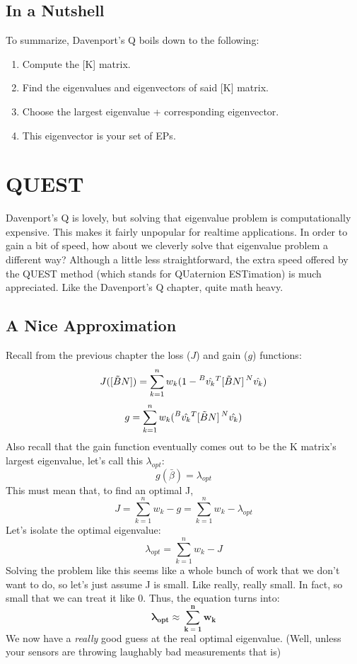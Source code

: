 \documentclass[a4paper,14pt]{extreport}
\newcommand{\vk}[1]{\prescript{#1}{}{\hat{v_k}}}
\begin{document}
\section{In a Nutshell}

To summarize, Davenport's Q boils down to the following:
\begin{enumerate}
\item{Compute the [K] matrix.}
\item{Find the eigenvalues and eigenvectors of said [K] matrix.}
\item{Choose the largest eigenvalue + corresponding eigenvector.}
\item{This eigenvector is your set of EPs.}
\end{enumerate}


\chapter{QUEST}
Davenport's Q is lovely, but solving that eigenvalue problem is computationally expensive. This makes it fairly unpopular for realtime applications. In order to gain a bit of speed, how about we cleverly solve that eigenvalue problem a different way? Although a little less straightforward, the extra speed offered by the QUEST method (which stands for QUaternion ESTimation) is much appreciated. Like the Davenport's Q chapter, quite math heavy.
\section{A Nice Approximation}
Recall from the previous chapter the loss ($J$) and gain ($g$) functions:
\[
J([\tilde{B}N]) = \sum^n_{k=1} w_k (1- \vk{B}^T[\tilde{B}N]\vk{N})
\]
\[
g = \sum^n_{k=1} w_k (\vk{B}^T[\tilde{B}N]\vk{N})
\]
Also recall that the gain function eventually comes out to be the K matrix's largest eigenvalue, let's call this $\lambda_{opt}$:
\[
g(\bar{\beta}) = \lambda_{opt}
\]
This must mean that, to find an optimal J,
\[
J = \sum^n_{k=1} w_k - g = \sum^n_{k=1} w_k - \lambda_{opt}
\]
Let's isolate the optimal eigenvalue:
\[
\lambda_{opt} = \sum^n_{k=1} w_k - J
\]
Solving the problem like this seems like a whole bunch of work that we don't want to do, so let's just assume J is small. Like really, really small. In fact, so small that we can treat it like 0. Thus, the equation turns into:
\[
\mathbf{
\lambda_{opt} \approx \sum^n_{k=1} w_k
}\]
We now have a \emph{really} good guess at the real optimal eigenvalue. (Well, unless your sensors are throwing laughably bad measurements that is)
\end{document}
